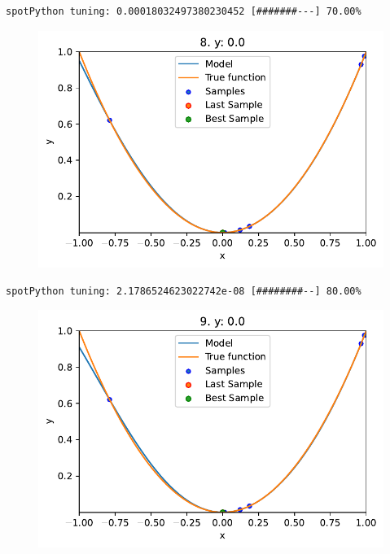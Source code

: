 \documentclass[
  letterpaper,
  DIV=11,
  numbers=noendperiod]{scrreprt}
\begin{document}
\begin{verbatim}
spotPython tuning: 0.00018032497380230452 [#######---] 70.00% 
\end{verbatim}

\begin{figure}[H]

{\centering \includegraphics{010_num_spot_sklearn_surrogate_files/figure-pdf/cell-21-output-10.pdf}

}

\end{figure}

\begin{verbatim}
spotPython tuning: 2.1786524623022742e-08 [########--] 80.00% 
\end{verbatim}

\begin{figure}[H]

{\centering \includegraphics{010_num_spot_sklearn_surrogate_files/figure-pdf/cell-21-output-12.pdf}

}

\end{figure}
\end{document}
